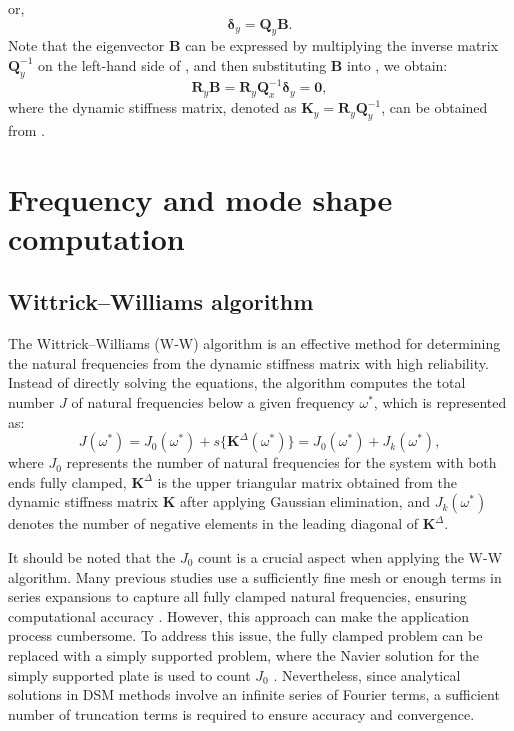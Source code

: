 \documentclass[preprint,12pt]{elsarticle}
\begin{document}
%
or,
%
\begin{equation}\label{eq:UBy1}
	\mathbf{\delta}_y= \mathbf{Q}_y\mathbf{B}.
\end{equation}
%
Note that the eigenvector \(\mathbf{B}\) can be expressed by multiplying the inverse matrix \(\mathbf{Q}_y^{-1}\) on the left-hand side of , and then substituting \(\mathbf{B}\) into , we obtain:
%
\begin{equation}\label{eq:DSM_eqy}
	\mathbf{R}_y\mathbf{B}=\mathbf{R}_y \mathbf{Q}_x^{-1} 
	\mathbf{\delta}_y = \mathbf{0},
\end{equation}
%
where the dynamic stiffness matrix, denoted as \(\mathbf{K}_y = \mathbf{R}_y \mathbf{Q}_y^{-1}\), can be obtained from .

\section{Frequency and mode shape computation}\label{sec:WWA}
\subsection{Wittrick–Williams algorithm}\label{sec:WWA2}
The Wittrick–Williams (W-W) algorithm \cite{wittrick1971general} is an effective method for determining the natural frequencies from the dynamic stiffness matrix with high reliability. 
Instead of directly solving the equations, the algorithm computes the total number \(J\) of natural frequencies below a given frequency \(\omega^*\), which is represented as:
\begin{equation}\label{eq:WWalgorithm}
	J(\omega^*) = J_0(\omega^*) + s\{\mathbf{K}^{\Delta}(\omega^*)\} = J_0(\omega^*) + J_k(\omega^*),
\end{equation}
where \(J_0\) represents the number of natural frequencies for the system with both ends fully clamped, \(\mathbf{K}^{\Delta}\) is the upper triangular matrix obtained from the dynamic stiffness matrix \(\mathbf{K}\) after applying Gaussian elimination, and \(J_k(\omega^*)\) denotes the number of negative elements in the leading diagonal of \(\mathbf{K}^{\Delta}\).

It should be noted that the \( J_0 \) count is a crucial aspect when applying the W-W algorithm. Many previous studies use a sufficiently fine mesh or enough terms in series expansions to capture all fully clamped natural frequencies, ensuring computational accuracy \cite{banerjee2015dynamic}. However, this approach can make the application process cumbersome. 
To address this issue, the fully clamped problem can be replaced with a simply supported problem, where the Navier solution for the simply supported plate is used to count \( J_0 \) \citep{liu2015exact}. 
Nevertheless, since analytical solutions in DSM methods involve an infinite series of Fourier terms, a sufficient number of truncation terms is required to ensure accuracy and convergence.   
\end{document}
